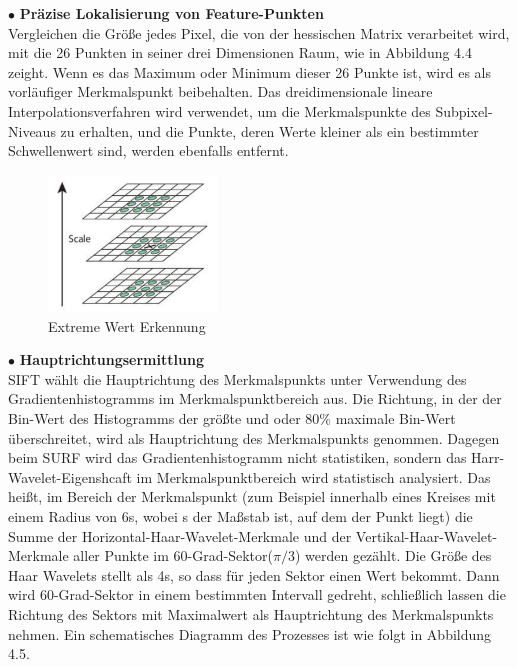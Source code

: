 $\bullet$ \textbf{Präzise Lokalisierung von Feature-Punkten}\\
Vergleichen die Größe jedes Pixel, die von der hessischen Matrix verarbeitet wird, mit die 26 Punkten in seiner drei Dimensionen Raum, wie in Abbildung 4.4 zeight. Wenn es das Maximum oder Minimum dieser 26 Punkte ist, wird es als vorläufiger Merkmalspunkt beibehalten. Das dreidimensionale lineare Interpolationsverfahren wird verwendet, um die Merkmalspunkte des Subpixel-Niveaus zu erhalten, und die Punkte, deren Werte kleiner als ein bestimmter Schwellenwert sind, werden ebenfalls entfernt.

\begin{figure}[htb]
 \centering 
 \includegraphics[keepaspectratio,width=0.4\textwidth]{images/3_Ersteverfahren/Extreme_Wert_Erkennung.pdf}
 \caption{Extreme Wert Erkennung}
 \label{fig:Extreme Wert Erkennung}
\end{figure} 


$\bullet$ \textbf{Hauptrichtungsermittlung}\\
SIFT wählt die Hauptrichtung des Merkmalspunkts unter Verwendung des Gradientenhistogramms im Merkmalspunktbereich aus. Die Richtung, in der der Bin-Wert des Histogramms der größte und oder 80\% maximale Bin-Wert  überschreitet, wird als Hauptrichtung des Merkmalspunkts genommen. Dagegen beim SURF wird das Gradientenhistogramm nicht statistiken, sondern das Harr-Wavelet-Eigenshcaft im Merkmalspunktbereich wird statistisch analysiert. Das heißt, im Bereich der Merkmalspunkt (zum Beispiel innerhalb eines Kreises mit einem Radius von 6s, wobei s der Maßstab ist, auf dem der Punkt liegt) die Summe der Horizontal-Haar-Wavelet-Merkmale und der Vertikal-Haar-Wavelet-Merkmale aller Punkte im  60-Grad-Sektor($\pi/3$) werden gezählt. Die Größe des Haar Wavelets stellt als 4s, so dass für jeden Sektor einen Wert bekommt. Dann wird 60-Grad-Sektor in einem bestimmten Intervall gedreht, schließlich lassen die Richtung des Sektors mit Maximalwert als Hauptrichtung des Merkmalspunkts nehmen. Ein schematisches Diagramm des Prozesses ist wie folgt in Abbildung 4.5.

